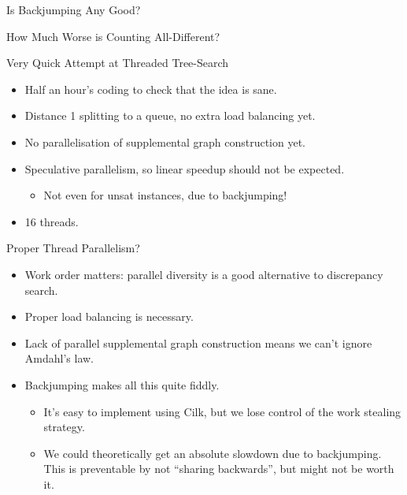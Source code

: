 \documentclass{beamer}
\begin{document}
\begin{frame}{Is Backjumping Any Good?}
    
\end{frame}

\begin{frame}{How Much Worse is Counting All-Different?}
    
\end{frame}

\begin{frame}{Very Quick Attempt at Threaded Tree-Search}
     {
        \begin{itemize}
            \item Half an hour's coding to check that the idea is sane.
            \item Distance 1 splitting to a queue, no extra load balancing yet.
            \item No parallelisation of supplemental graph construction yet.
            \item Speculative parallelism, so linear speedup should not be expected.
                \begin{itemize}
                    \item Not even for unsat instances, due to backjumping!
                \end{itemize}
            \item 16 threads.
        \end{itemize}
    }

     {
        
    }

     {
        
    }
\end{frame}

\begin{frame}{Proper Thread Parallelism?}
    \begin{itemize}
        \item Work order matters: parallel diversity is a good alternative to discrepancy search.

        \item Proper load balancing is necessary.

        \item Lack of parallel supplemental graph construction means we can't ignore
            Amdahl's law.

        \item Backjumping makes all this quite fiddly.
            \begin{itemize}
                \item It's easy to implement using Cilk, but we lose control of the work stealing
                    strategy.
                \item We could theoretically get an absolute slowdown due to backjumping. This is
                    preventable by not ``sharing backwards'', but might not be worth it.
            \end{itemize}
    \end{itemize}
\end{frame}
\end{document}
